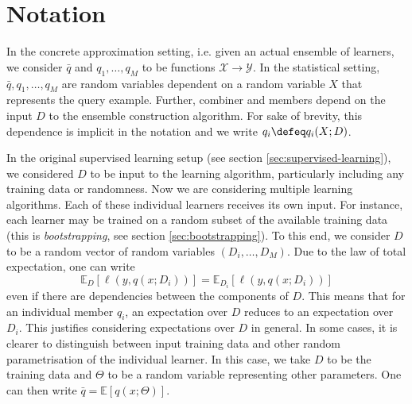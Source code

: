 \documentclass[
    a4paper, %
	fontsize=10pt, %
	twoside=false, %
]{kaobook}
\begin{document}
\section{Notation}
\label{sec:ensemble-learning-notation}
In the concrete approximation setting, i.e. given an actual ensemble of learners, we consider $\bar{q}$ and $q_{1}, \dots, q_{M}$ to be functions $\mathcal{X} \to \mathcal{Y}$. In the statistical setting, $\bar{q}, q_{1}, \dots, q_{M}$ are random variables dependent on a random variable $X$ that represents the query example. Further, combiner and members depend on the input $D$ to the ensemble construction algorithm. For sake of brevity, this dependence is implicit in the notation and we write $q_{i} \defeq q_{i}(X;D)$.

In the original supervised learning setup (see section \ref{sec:supervised-learning}), we considered $D$ to be input to the learning algorithm, particularly including any training data or randomness. Now we are considering multiple learning algorithms. Each of these individual learners receives its own input. For instance, each learner may be trained on a random subset of the available training data (this is \textit{bootstrapping}, see section \ref{sec:bootstrapping}). To this end, we consider $D$ to be a random vector of random variables $(D_{i}, \dots, D_{M})$. 
Due to the law of total expectation, one can write
$$
\mathbb{E}_{D}\left[ \ell(y, q(x; D_{i})) \right]  = \mathbb{E}_{D_{i}}\left[ \ell(y, q(x; D_{i})) \right] 
$$
even if there are dependencies between the components of $D$. This means that for an individual member $q_{i}$, an expectation over $D$ reduces to an expectation over $D_{i}$. This justifies considering expectations over $D$ in general.
In some cases, it is clearer to distinguish between input training data and other random parametrisation of the individual learner. In this case, we take $D$ to be the training data and $\Theta$ to be a random variable representing other parameters. One can then write $\bar{q} = \mathbb{E}\left[q(x; \Theta)\right]$.


\end{document}
